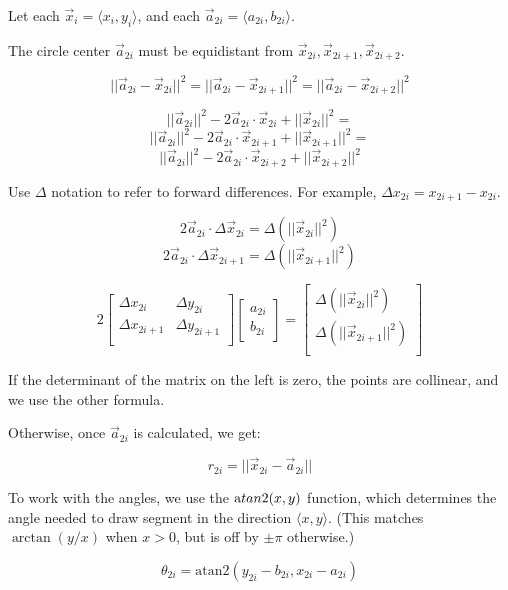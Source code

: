 \documentclass[11pt]{article}
\begin{document}
Let each \(\vec x_i = \langle x_i, y_i \rangle\), and each \(\vec a_{2i} = \langle a_{2i}, b_{2i} \rangle\). 

The circle center \(\vec a_{2i}\) must be equidistant from \(\vec x_{2i}, \vec x_{2i+1}, \vec x_{2i+2}\). 

$$ || \vec a_{2i} - \vec x_{2i} ||^2 = 
|| \vec a_{2i} - \vec x_{2i+1} ||^2 = 
|| \vec a_{2i} - \vec x_{2i+2} ||^2 $$

$$ 
|| \vec a_{2i} ||^2 - 2 \vec a_{2i} \cdot \vec x_{2i} + || \vec x_{2i} ||^2 = 
$$
$$ 
|| \vec a_{2i} ||^2 - 2 \vec a_{2i} \cdot \vec x_{2i+1} + || \vec x_{2i+1} ||^2 = 
$$
$$ 
|| \vec a_{2i} ||^2 - 2 \vec a_{2i} \cdot \vec x_{2i+2} + || \vec x_{2i+2} ||^2
$$

Use \(\Delta\) notation to refer to forward differences. For example, \(\Delta x_{2i} = x_{2i+1} - x_{2i}\). 

$$ 2 \vec a_{2i} \cdot \Delta \vec x_{2i} = \Delta (||\vec x_{2i} ||^2)
$$
$$ 2 \vec a_{2i} \cdot \Delta \vec x_{2i+1} = \Delta (||\vec x_{2i+1} ||^2)
$$

$$
2
\left[
\begin{array}{cc}
\Delta x_{2i} & \Delta y_{2i} \\
\Delta x_{2i+1} & \Delta y_{2i+1} \\
\end{array}
\right]
\left[
\begin{array}{c}
a_{2i} \\ b_{2i}
\end{array}
\right]
=
\left[
\begin{array}{c}
\Delta (||\vec x_{2i} ||^2) \\
\Delta (||\vec x_{2i+1} ||^2) \\
\end{array}
\right]
$$

If the determinant of the matrix on the left is zero, the points are collinear, and we use the other formula. 

Otherwise, once \(\vec a_{2i}\) is calculated, we get:

$$ r_{2i} = || \vec x_{2i} - \vec a_{2i} || $$

To work with the angles, we use the \({\text atan2}(x,y)\) function, which determines the angle needed to draw segment in the direction \(\langle x, y\rangle\). (This matches \(\arctan(y/x)\) when \(x > 0\), but is off by \(\pm \pi\) otherwise.)

$$ \theta_{2i} = \text{atan2}(y_{2i} - b_{2i}, x_{2i} - a_{2i}) $$
\end{document}
